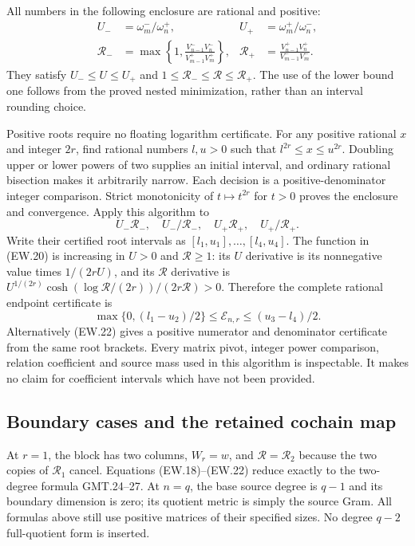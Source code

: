 All numbers in the following enclosure are rational and positive:
\[
 \begin{aligned}
 U_-&=\omega_m^-/\omega_n^+,&
 U_+&=\omega_m^+/\omega_n^-,\\
 \mathscr R_-&=\max\left\{1,
 \frac{V_{n-1}^-V_n^-}{V_{m-1}^+V_m^+}\right\},&
 \mathscr R_+&=\frac{V_{n-1}^+V_n^+}{V_{m-1}^-V_m^-}.
 \end{aligned}                                                 \tag{EW.44}
\]
They satisfy $U_-\le U\le U_+$ and
$1\le\mathscr R_-\le\mathscr R\le\mathscr R_+$.
The use of the lower bound one follows from the proved nested
minimization, rather than an interval rounding choice.

Positive roots require no floating logarithm certificate. For any
positive rational $x$ and integer $2r$, find rational numbers
$l,u>0$ such that $l^{2r}\le x\le u^{2r}$. Doubling upper
or lower powers of two supplies an initial interval, and ordinary
rational bisection makes it arbitrarily narrow. Each decision is a
positive-denominator integer comparison. Strict monotonicity of
$t\mapsto t^{2r}$ for $t>0$ proves the enclosure and convergence.
Apply this algorithm to
\[
 U_-\mathscr R_-,\quad U_-/\mathscr R_-,\quad
 U_+\mathscr R_+,\quad U_+/\mathscr R_+.
\]
Write their certified root intervals as $[l_1,u_1],\ldots,[l_4,u_4]$.
The function in (EW.20) is increasing in $U>0$ and
$\mathscr R\ge1$: its $U$ derivative is its nonnegative value
times $1/(2rU)$, and its $\mathscr R$ derivative is
$U^{1/(2r)}\cosh(\log\mathscr R/(2r))/(2r\mathscr R)>0$.
Therefore the complete rational endpoint certificate is
\[
 \boxed{\max\{0,(l_1-u_2)/2\}
             \le\mathcal E_{n,r}\le(u_3-l_4)/2.}             \tag{EW.45}
\]
Alternatively (EW.22) gives a positive numerator and denominator
certificate from the same root brackets. Every matrix pivot, integer
power comparison, relation coefficient and source mass used in this
algorithm is inspectable. It makes no claim for coefficient intervals
which have not been provided.

\subsection{Boundary cases and the retained cochain map}

At $r=1$, the block has two columns, $W_r=w$, and
$\mathscr R=\mathscr R_2$ because the two copies of
$\mathscr R_1$ cancel. Equations (EW.18)--(EW.22) reduce exactly
to the two-degree formula GMT.24--27. At $n=q$, the base source
degree is $q-1$ and its boundary dimension is zero; its quotient
metric is simply the source Gram. All formulas above still use
positive matrices of their specified sizes. No degree $q-2$
full-quotient form is inserted.

